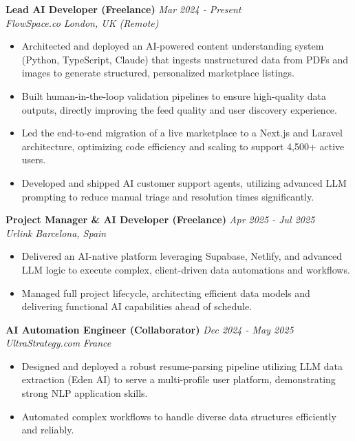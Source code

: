 \documentclass[11pt, a4paper]{article}
\begin{document}
\noindent \textbf{Lead AI Developer (Freelance)} \hfill \textit{Mar 2024 - Present} \\
\textit{FlowSpace.co} \hfill \textit{London, UK (Remote)}
\begin{itemize}[leftmargin=1.5em, itemsep=2pt]
    \item Architected and deployed an AI-powered content understanding system (Python, TypeScript, Claude) that ingests unstructured data from PDFs and images to generate structured, personalized marketplace listings.
    \item Built human-in-the-loop validation pipelines to ensure high-quality data outputs, directly improving the feed quality and user discovery experience.
    \item Led the end-to-end migration of a live marketplace to a Next.js and Laravel architecture, optimizing code efficiency and scaling to support 4,500+ active users.
    \item Developed and shipped AI customer support agents, utilizing advanced LLM prompting to reduce manual triage and resolution times significantly.
\end{itemize}

\vspace{6pt}
\noindent \textbf{Project Manager \& AI Developer (Freelance)} \hfill \textit{Apr 2025 - Jul 2025} \\
\textit{Urlink} \hfill \textit{Barcelona, Spain}
\begin{itemize}[leftmargin=1.5em, itemsep=2pt]
    \item Delivered an AI-native platform leveraging Supabase, Netlify, and advanced LLM logic to execute complex, client-driven data automations and workflows.
    \item Managed full project lifecycle, architecting efficient data models and delivering functional AI capabilities ahead of schedule.
\end{itemize}

\vspace{6pt}
\noindent \textbf{AI Automation Engineer (Collaborator)} \hfill \textit{Dec 2024 - May 2025} \\
\textit{UltraStrategy.com} \hfill \textit{France}
\begin{itemize}[leftmargin=1.5em, itemsep=2pt]
    \item Designed and deployed a robust resume-parsing pipeline utilizing LLM data extraction (Eden AI) to serve a multi-profile user platform, demonstrating strong NLP application skills.
    \item Automated complex workflows to handle diverse data structures efficiently and reliably.
\end{itemize}
\end{document}
